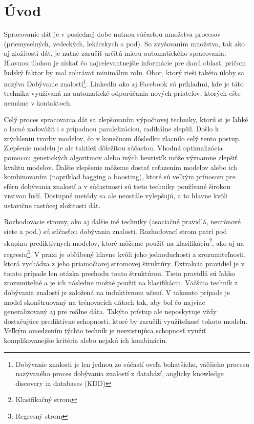 \chapter{Úvod}
\setlength{\parskip}{0.5em}
\setlength{\parindent}{0cm}
Spracovanie dát je v poslednej dobe nutnou súčasťou množstva procesov (priemyselných, vedeckých, lekárskych a pod). So zvyšovaním množstva, tak ako aj zložitosti dát, je nutné zaručiť určitú mieru automatického spracovania. Hlavnou úlohou je získať čo najrelevantnejšie informácie pre danú oblasť, pričom ľudský faktor by mal zohrávať minimálnu rolu. Obor, ktorý rieši takéto úlohy sa nazýva Dobývanie znalostí\footnote{Dobývanie znalosti je len jednou zo súčastí oveľa bohatšieho, väčšieho procesu nazývaného proces dobývania znalostí z databází, anglicky knowledge discovery in databases (KDD)}. LinkedIn ako aj Facebook sú príkladmi, kde je táto technika využívaná na automatické odporúčania nových priateľov, ktorých ešte nemáme v kontaktoch.

Celý proces spracovania dát sa zlepšovaním výpočtovej techniky, ktorú si je ľahké a lacné zadovážiť i s prípadnou paralelizáciou, radikálne zlepšil. Došlo k zrýchleniu tvorby modelov, čo v konečnom dôsledku zlacnilo celý tento postup. Zlepšenie modelu je ale taktiež dôležitou súčasťou. Vhodná optimalizácia pomocou genetických algoritmov alebo iných heuristík môže významne zlepšiť kvalitu modelov. Ďalšie zlepšenie môžeme dostať reťazením modelov alebo ich kombinovaním (napríklad bagging a boosting), ktoré sú veľkým prínosom pre sféru dobývania znalostí a v súčastnosti sú tieto techniky používané širokou vrstvou ľudí. Dostupné metódy sa ale neustále vylepšujú, a to hlavne kvôli ustavične rastúcej zložitosti dát.

Rozhodovacie stromy, ako aj ďalšie iné techniky (asociačné pravidlá, neurónové siete a pod.) sú súčasťou dobývania znalosti. Rozhodovací strom patrí pod skupinu prediktívnych modelov, ktoré môžeme použiť na klasifikáciu\footnote{Klasifikačný strom}, ako aj na regresiu\footnote{Regresný strom}. V praxi je obľúbený hlavne kvôli jeho jednoduchosti a zrozumiteľnosti, ktorá vychádza z jeho priamočiarej stromovej štruktúry. Extrakcia pravidiel je v tomto prípade len otázka prechodu touto štruktúrou. Tieto pravidlá sú ľahko zrozumiteľné a je ich následne možné použiť na klasifikáciu. Väčšina techník z dobývania znalostí je založená na induktívnom učení. V takomto prípade je model skonštruovaný na trénovacích dátach tak, aby bol čo najviac generalizovaný aj pre reálne dáta. Takýto prístup ale neposkytuje vždy dostačujúce prediktívne schopnosti, ktoré by zaručili využiteľnosť tohoto modelu. Veľkým omedzením týchto techník je neexistujúca schopnosť využiť komplikovanejšie kritéria alebo nejakú ich kombináciu.

